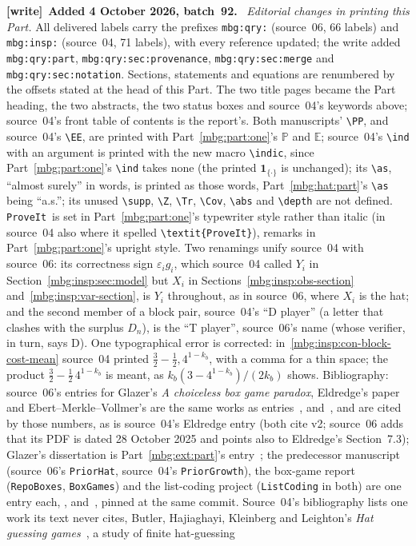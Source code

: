 \documentclass[11pt,letterpaper]{article}
\theoremstyle{definition}
\newcommand{\E}{\mathbb E}
\newcommand{\Prb}{\mathbb P}
\newcommand{\repo}{\texttt{ProveIt}}
\newenvironment{writenote}[1][]{\par\smallskip\begingroup\small
 \noindent\textbf{[write]}\if\relax\detokenize{#1}\relax\else~\textbf{#1.}\fi\ }%
 {\par\endgroup\smallskip}
\begin{document}
\begin{writenote}[Added 4 October 2026, batch~92]
\emph{Editorial changes in printing this Part.} All delivered labels carry the prefixes \texttt{mbg:qry:} (source~06, 66 labels) and \texttt{mbg:insp:} (source~04, 71 labels), with every reference updated; the write added \texttt{mbg:qry:part}, \texttt{mbg:qry:sec:provenance}, \texttt{mbg:qry:sec:merge} and \texttt{mbg:qry:sec:notation}. Sections, statements and equations are renumbered by the offsets stated at the head of this Part. The two title pages became the Part heading, the two abstracts, the two status boxes and source~04's keywords above; source~04's front table of contents is the report's. Both manuscripts' \texttt{\textbackslash PP}, and source~04's \texttt{\textbackslash EE}, are printed with Part~\ref{mbg:part:one}'s $\Prb$ and $\E$; source~04's \texttt{\textbackslash ind} with an argument is printed with the new macro \texttt{\textbackslash indic}, since Part~\ref{mbg:part:one}'s \texttt{\textbackslash ind} takes none (the printed $\mathbf 1_{\{\cdot\}}$ is unchanged); its \texttt{\textbackslash as}, ``almost surely'' in words, is printed as those words, Part~\ref{mbg:hat:part}'s \texttt{\textbackslash as} being ``a.s.''; its unused \texttt{\textbackslash supp}, \texttt{\textbackslash Z}, \texttt{\textbackslash Tr}, \texttt{\textbackslash Cov}, \texttt{\textbackslash abs} and \texttt{\textbackslash depth} are not defined. \repo\ is set in Part~\ref{mbg:part:one}'s typewriter style rather than italic (in source~04 also where it spelled \texttt{\textbackslash textit\{ProveIt\}}), remarks in Part~\ref{mbg:part:one}'s upright style. Two renamings unify source~04 with source~06: its correctness sign $\varepsilon_ig_i$, which source~04 called $Y_i$ in Section~\ref{mbg:insp:sec:model} but $X_i$ in Sections~\ref{mbg:insp:obs-section} and~\ref{mbg:insp:var-section}, is $Y_i$ throughout, as in source~06, where $X_i$ is the hat; and the second member of a block pair, source~04's ``D player'' (a letter that clashes with the surplus $D_n$), is the ``T player'', source~06's name (whose verifier, in turn, says D). One typographical error is corrected: in~\eqref{mbg:insp:con-block-cost-mean} source~04 printed $\frac32-\frac12,4^{1-k_b}$, with a comma for a thin space; the product $\frac32-\frac12\,4^{1-k_b}$ is meant, as $k_b(3-4^{1-k_b})/(2k_b)$ shows. Bibliography: source~06's entries for Glazer's \emph{A choiceless box game paradox}, Eldredge's paper and Ebert--Merkle--Vollmer's are the same works as entries~\cite{GlazerBox}, \cite{hat:Eldredge} and~\cite{hat:EMV}, and are cited by those numbers, as is source~04's Eldredge entry (both cite v2; source~06 adds that its PDF is dated 28 October 2025 and points also to Eldredge's Section~7.3); Glazer's dissertation is Part~\ref{mbg:ext:part}'s entry~\cite{ext:GlazerThesis}; the predecessor manuscript (source~06's \texttt{PriorHat}, source~04's \texttt{PriorGrowth}), the box-game report (\texttt{RepoBoxes}, \texttt{BoxGames}) and the list-coding project (\texttt{ListCoding} in both) are one entry each, \cite{qry:PriorHat}, \cite{qry:RepoBoxes} and~\cite{qry:ListCoding}, pinned at the same commit. Source~04's bibliography lists one work its text never cites, Butler, Hajiaghayi, Kleinberg and Leighton's \emph{Hat guessing games}~\cite{insp:Butler}, a study of finite hat-guessing 
\end{writenote}
\end{document}
